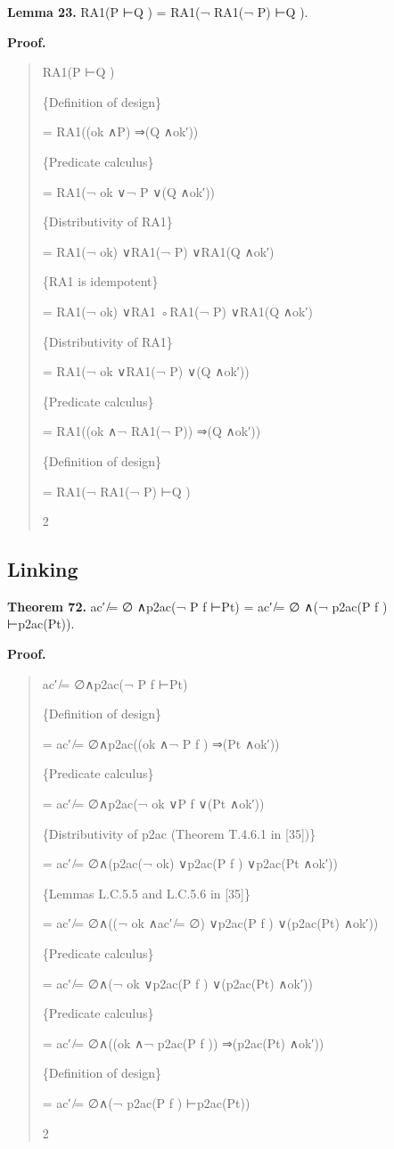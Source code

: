 \documentclass[11pt]{article}
\begin{document}
\noindent\textbf{Lemma 23.} RA1(P ⊢Q ) = RA1(¬ RA1(¬ P) ⊢Q ).


\noindent\textbf{Proof.}


\begin{quote}\small\raggedright
RA1(P ⊢Q )
\par
\{Definition of design\}
\par
= RA1((ok ∧P) ⇒(Q ∧ok′))
\par
\{Predicate calculus\}
\par
= RA1(¬ ok ∨¬ P ∨(Q ∧ok′))
\par
\{Distributivity of RA1\}
\par
= RA1(¬ ok) ∨RA1(¬ P) ∨RA1(Q ∧ok′)
\par
\{RA1 is idempotent\}
\par
= RA1(¬ ok) ∨RA1 ◦RA1(¬ P) ∨RA1(Q ∧ok′)
\par
\{Distributivity of RA1\}
\par
= RA1(¬ ok ∨RA1(¬ P) ∨(Q ∧ok′))
\par
\{Predicate calculus\}
\par
= RA1((ok ∧¬ RA1(¬ P)) ⇒(Q ∧ok′))
\par
\{Definition of design\}
\par
= RA1(¬ RA1(¬ P) ⊢Q )
\par
2
\end{quote}

\subsection{Linking}
\noindent\textbf{Theorem 72.} ac′ ̸= ∅ ∧p2ac(¬ P f ⊢Pt) = ac′ ̸= ∅ ∧(¬ p2ac(P f ) ⊢p2ac(Pt)).


\noindent\textbf{Proof.}


\begin{quote}\small\raggedright
ac′ ̸= ∅∧p2ac(¬ P f ⊢Pt)
\par
\{Definition of design\}
\par
= ac′ ̸= ∅∧p2ac((ok ∧¬ P f ) ⇒(Pt ∧ok′))
\par
\{Predicate calculus\}
\par
= ac′ ̸= ∅∧p2ac(¬ ok ∨P f ∨(Pt ∧ok′))
\par
\{Distributivity of p2ac (Theorem T.4.6.1 in [35])\}
\par
= ac′ ̸= ∅∧(p2ac(¬ ok) ∨p2ac(P f ) ∨p2ac(Pt ∧ok′))
\par
\{Lemmas L.C.5.5 and L.C.5.6 in [35]\}
\par
= ac′ ̸= ∅∧((¬ ok ∧ac′ ̸= ∅) ∨p2ac(P f ) ∨(p2ac(Pt) ∧ok′))
\par
\{Predicate calculus\}
\par
= ac′ ̸= ∅∧(¬ ok ∨p2ac(P f ) ∨(p2ac(Pt) ∧ok′))
\par
\{Predicate calculus\}
\par
= ac′ ̸= ∅∧((ok ∧¬ p2ac(P f )) ⇒(p2ac(Pt) ∧ok′))
\par
\{Definition of design\}
\par
= ac′ ̸= ∅∧(¬ p2ac(P f ) ⊢p2ac(Pt))
\par
2
\end{quote}
\end{document}

